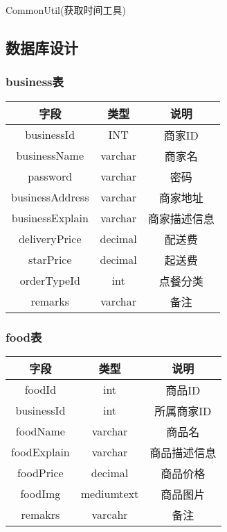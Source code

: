 CommonUtil(获取时间工具)
\subsection{数据库设计}

\subsubsection{business表}
\begin{tabular}{c|c|c}
    \hline
    字段              & 类型      & 说明     \\
    \hline
    businessId      & INT     & 商家ID   \\
    \hline
    businessName    & varchar & 商家名    \\
    \hline
    password        & varchar & 密码     \\
    \hline
    businessAddress & varchar & 商家地址   \\
    \hline
    businessExplain & varchar & 商家描述信息 \\
    \hline
    deliveryPrice   & decimal & 配送费    \\
    \hline
    starPrice       & decimal & 起送费    \\
    \hline
    orderTypeId     & int     & 点餐分类   \\
    \hline
    remarks         & varchar & 备注     \\
\end{tabular}

\subsubsection{food表}
\begin{tabular}{c|c|c}
    \hline
    字段          & 类型         & 说明     \\
    \hline
    foodId      & int        & 商品ID   \\
    \hline
    businessId  & int        & 所属商家ID \\
    \hline
    foodName    & varchar    & 商品名    \\
    \hline
    foodExplain & varchar    & 商品描述信息 \\
    \hline
    foodPrice   & decimal    & 商品价格   \\
    \hline
    foodImg     & mediumtext & 商品图片   \\
    \hline
    remakrs     & varcahr    & 备注     \\
\end{tabular}

